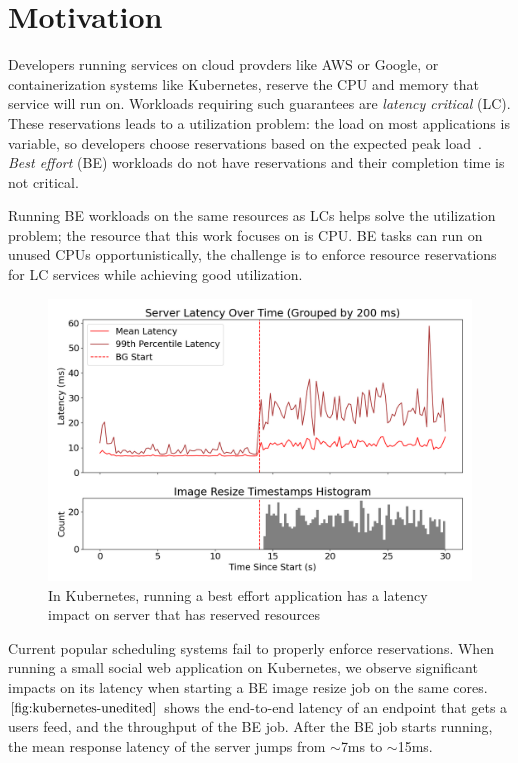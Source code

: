 \section{Motivation}

Developers running services on cloud provders like AWS or Google, or
containerization systems like Kubernetes, reserve the CPU and memory that
service will run on. Workloads requiring such guarantees are \textit{latency
critical} (LC). These reservations leads to a utilization problem: the load on
most applications is variable, so developers choose reservations based on the
expected peak load~\cite{borg, nu, overprovision}. \textit{Best effort} (BE)
workloads do not have reservations and their completion time is not critical.

Running BE workloads on the same resources as LCs helps solve the utilization
problem; the resource that this work focuses on is CPU. BE tasks can run on
unused CPUs opportunistically, the challenge is to enforce resource reservations
for LC services while achieving good utilization.

\begin{figure}[t]
    \centering
    \includegraphics[width=\columnwidth]{graphs/kubernetes-unedited.png}
    \caption{In Kubernetes, running a best effort application has a latency
    impact on server that has reserved resources}\label{fig:kubernetes-unedited}
\end{figure}

Current popular scheduling systems fail to properly enforce reservations. When
running a small social web application on Kubernetes, we observe significant
impacts on its latency when starting a BE image resize job on the same cores.
$\autoref{fig:kubernetes-unedited}$ shows the end-to-end latency of an endpoint
that gets a users feed, and the throughput of the BE job. After the BE job
starts running, the mean response latency of the server jumps from $\sim$7ms to
$\sim$15ms.




